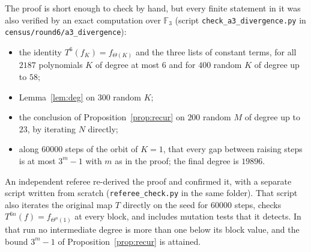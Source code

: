 \documentclass[11pt,a4paper]{article}
\theoremstyle{remark}
\newcommand{\F}{\mathbb F}
\begin{document}
The proof is short enough to check by hand, but every finite statement in it was also verified by
an exact computation over $\F_3$ (script \texttt{check\_a3\_divergence.py} in
\texttt{census/round6/a3\_divergence}):
\begin{itemize}
\item the identity $T^6(f_K)=f_{\Theta(K)}$ and the three lists of constant terms, for all $2187$
  polynomials $K$ of degree at most $6$ and for $400$ random $K$ of degree up to $58$;
\item Lemma~\ref{lem:deg} on $300$ random $K$;
\item the conclusion of Proposition~\ref{prop:recur} on $200$ random $M$ of degree up to $23$, by
  iterating $N$ directly;
\item along $60000$ steps of the orbit of $K=1$, that every gap between raising steps is at most
  $3^m-1$ with $m$ as in the proof; the final degree is $19896$.
\end{itemize}
An independent referee re-derived the proof and confirmed it, with a separate script written from
scratch (\texttt{referee\_check.py} in the same folder). That script also iterates the original map $T$
directly on the seed for $60000$ steps, checks $T^{6n}(f)=f_{\Theta^n(1)}$ at every block, and includes
mutation tests that it detects. In that run no intermediate degree is more than one below its block
value, and the bound $3^m-1$ of Proposition~\ref{prop:recur} is attained.
\end{document}
